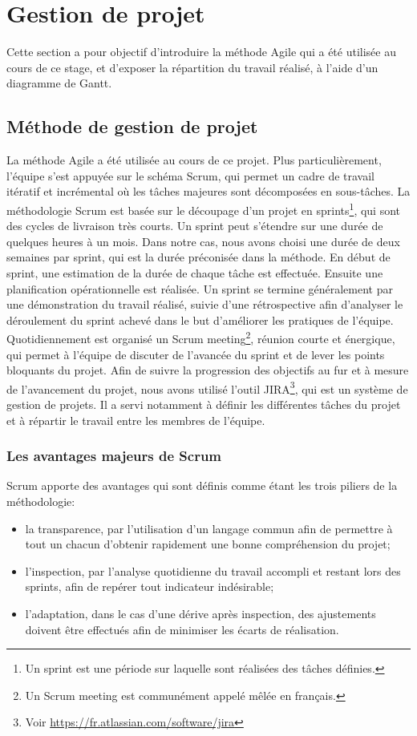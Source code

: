 \documentclass{tnreport}
\begin{document}
\section{Gestion de projet}

Cette section a pour objectif d'introduire la méthode Agile qui a été utilisée au cours de ce stage, et d'exposer la répartition du travail réalisé, à l'aide d'un diagramme de Gantt.

\subsection{Méthode de gestion de projet}

La méthode Agile a été utilisée au cours de ce projet. 
Plus particulièrement, l'équipe s'est appuyée sur le schéma Scrum, qui permet un cadre de travail itératif et incrémental où les tâches majeures sont décomposées en sous-tâches.
La méthodologie Scrum est basée sur le découpage d'un projet en sprints\footnote{Un sprint est une période sur laquelle sont réalisées des tâches définies.}, qui sont des cycles de livraison très courts.
Un sprint peut s'étendre sur une durée de quelques heures à un mois. 
Dans notre cas, nous avons choisi une durée de deux semaines par sprint, qui est la durée préconisée dans la méthode.
En début de sprint, une estimation de la durée de chaque tâche est effectuée. Ensuite une planification opérationnelle est réalisée.
Un sprint se termine généralement par une démonstration du travail réalisé, suivie d'une rétrospective afin d'analyser le déroulement du sprint achevé dans le but d'améliorer les pratiques de l'équipe. 
Quotidiennement est organisé un Scrum meeting\footnote{Un Scrum meeting est communément appelé mêlée en français.}, réunion courte et énergique, qui permet à l'équipe de discuter de l'avancée du sprint et de lever les points bloquants du projet.
Afin de suivre la progression des objectifs au fur et à mesure de l’avancement du projet, nous avons utilisé l'outil JIRA\footnote{Voir \url{https://fr.atlassian.com/software/jira}}, qui est un système de gestion de projets. Il a servi notamment à définir les différentes tâches du projet et à répartir le travail entre les membres de l’équipe.

\subsubsection{Les avantages majeurs de Scrum}

Scrum apporte des avantages qui sont définis comme étant les trois piliers de la méthodologie:
\begin{itemize}
	\item la transparence, par l'utilisation d'un langage commun afin de permettre à tout un chacun d'obtenir rapidement une bonne compréhension du projet; 
	\item l'inspection, par l'analyse quotidienne du travail accompli et restant lors des sprints, afin de repérer tout indicateur indésirable;
	\item l'adaptation, dans le cas d'une dérive après inspection, des ajustements doivent être effectués afin de minimiser les écarts de réalisation.
\end{itemize}
\end{document}
